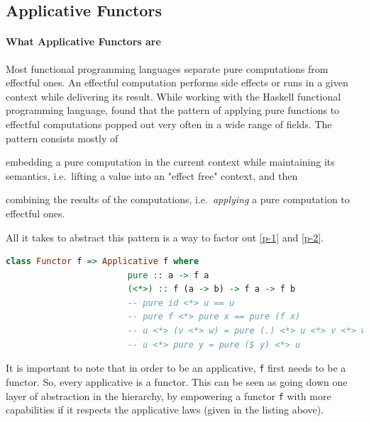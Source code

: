 \documentclass[
  oneside,
  11pt, a4paper,
  footinclude=true,
  headinclude=true,
  cleardoublepage=empty
]{scrbook}
\theoremstyle{definition}
\theoremstyle{definition}
\begin{document}
	    \subsection{Applicative Functors}
	    
	        \paragraph{What Applicative Functors are}
	        
    Most functional programming languages separate pure computations from effectful ones. An effectful computation performs side effects or runs in a given context while delivering its result. While working with the Haskell functional programming language, \cite{mcbride2008applicative} found that the pattern of applying pure functions to effectful computations popped out very often in a wide range of fields. The pattern consists mostly of
	    \begin{inparaenum}
            \item embedding a pure computation in the current context while maintaining its semantics, i.e.\ lifting a value into an "effect free" context,\label{p-1} and then
            \item combining the results of the computations, i.e.\ \emph{applying} a pure computation to effectful ones.\label{p-2}
        \end{inparaenum}
	All it takes to abstract this pattern is a way to factor out \ref{p-1} and \ref{p-2}.
	             
	            \begin{lstlisting}[language=Haskell, caption={Applicative laws},captionpos=b]
	                class Functor f => Applicative f where
	                    pure :: a -> f a
	                    (<*>) :: f (a -> b) -> f a -> f b
	                    -- pure id <*> u == u
	                    -- pure f <*> pure x == pure (f x)
	                    -- u <*> (v <*> w) = pure (.) <*> u <*> v <*> w
	                    -- u <*> pure y = pure ($ y) <*> u
	            \end{lstlisting}{}
	            
    It is important to note that in order to be an applicative, \texttt{f} first needs to be a functor. So, every applicative is a functor. This can be seen as going down one layer of abstraction in the hierarchy, by empowering a functor \texttt{f} with more capabilities if it respects the applicative laws (given in the listing above).
	            
\end{document}
